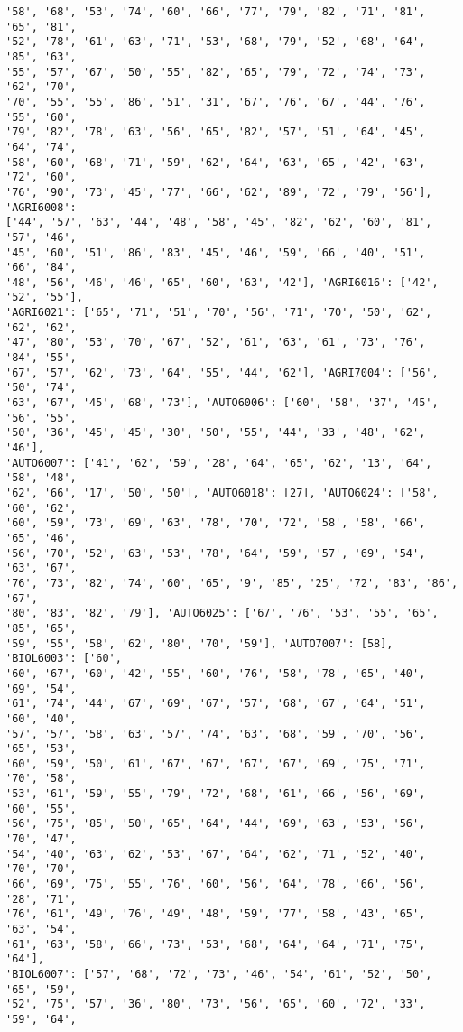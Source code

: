 \documentclass[11pt]{article}
\begin{document}
\begin{Verbatim}[commandchars=\\\{\}]
'58', '68', '53', '74', '60', '66', '77', '79', '82', '71', '81', '65', '81',
'52', '78', '61', '63', '71', '53', '68', '79', '52', '68', '64', '85', '63',
'55', '57', '67', '50', '55', '82', '65', '79', '72', '74', '73', '62', '70',
'70', '55', '55', '86', '51', '31', '67', '76', '67', '44', '76', '55', '60',
'79', '82', '78', '63', '56', '65', '82', '57', '51', '64', '45', '64', '74',
'58', '60', '68', '71', '59', '62', '64', '63', '65', '42', '63', '72', '60',
'76', '90', '73', '45', '77', '66', '62', '89', '72', '79', '56'], 'AGRI6008':
['44', '57', '63', '44', '48', '58', '45', '82', '62', '60', '81', '57', '46',
'45', '60', '51', '86', '83', '45', '46', '59', '66', '40', '51', '66', '84',
'48', '56', '46', '46', '65', '60', '63', '42'], 'AGRI6016': ['42', '52', '55'],
'AGRI6021': ['65', '71', '51', '70', '56', '71', '70', '50', '62', '62', '62',
'47', '80', '53', '70', '67', '52', '61', '63', '61', '73', '76', '84', '55',
'67', '57', '62', '73', '64', '55', '44', '62'], 'AGRI7004': ['56', '50', '74',
'63', '67', '45', '68', '73'], 'AUTO6006': ['60', '58', '37', '45', '56', '55',
'50', '36', '45', '45', '30', '50', '55', '44', '33', '48', '62', '46'],
'AUTO6007': ['41', '62', '59', '28', '64', '65', '62', '13', '64', '58', '48',
'62', '66', '17', '50', '50'], 'AUTO6018': [27], 'AUTO6024': ['58', '60', '62',
'60', '59', '73', '69', '63', '78', '70', '72', '58', '58', '66', '65', '46',
'56', '70', '52', '63', '53', '78', '64', '59', '57', '69', '54', '63', '67',
'76', '73', '82', '74', '60', '65', '9', '85', '25', '72', '83', '86', '67',
'80', '83', '82', '79'], 'AUTO6025': ['67', '76', '53', '55', '65', '85', '65',
'59', '55', '58', '62', '80', '70', '59'], 'AUTO7007': [58], 'BIOL6003': ['60',
'60', '67', '60', '42', '55', '60', '76', '58', '78', '65', '40', '69', '54',
'61', '74', '44', '67', '69', '67', '57', '68', '67', '64', '51', '60', '40',
'57', '57', '58', '63', '57', '74', '63', '68', '59', '70', '56', '65', '53',
'60', '59', '50', '61', '67', '67', '67', '67', '69', '75', '71', '70', '58',
'53', '61', '59', '55', '79', '72', '68', '61', '66', '56', '69', '60', '55',
'56', '75', '85', '50', '65', '64', '44', '69', '63', '53', '56', '70', '47',
'54', '40', '63', '62', '53', '67', '64', '62', '71', '52', '40', '70', '70',
'66', '69', '75', '55', '76', '60', '56', '64', '78', '66', '56', '28', '71',
'76', '61', '49', '76', '49', '48', '59', '77', '58', '43', '65', '63', '54',
'61', '63', '58', '66', '73', '53', '68', '64', '64', '71', '75', '64'],
'BIOL6007': ['57', '68', '72', '73', '46', '54', '61', '52', '50', '65', '59',
'52', '75', '57', '36', '80', '73', '56', '65', '60', '72', '33', '59', '64',

\end{Verbatim}
\end{document}
